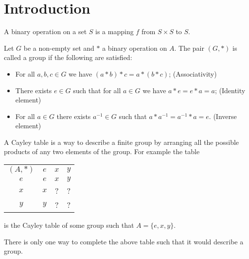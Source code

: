 \documentclass[11pt,a4paper]{article}
\begin{document}
	\maketitle


	\newpage
  \tableofcontents
  \newpage

  \section{Introduction}
  \begin{definition}
    A binary operation on a set $S$ is a mapping $f$ from $S \times S$
    to $S$.
  \end{definition}

  \begin{definition}[Group]
    Let $G$ be a non-empty set and $*$ a binary operation on $A$.
    The pair $(G,*)$ is called a group if the following are satisfied:
	  \begin{itemize}
      \item For all $a,b,c \in G$ we have $(a * b) * c = a * (b * c)$;
        (Associativity)
      \item There exists $e \in G$ such that for all $a \in G$ we have
        $a * e = e * a = a$; (Identity element)
      \item For all $a \in G$ there exists $a^{-1} \in G$ such that
        $a * a^{-1} = a^{-1} * a = e$. (Inverse element)
	  \end{itemize}
  \end{definition}

  \begin{definition}
    A Cayley table is a way to describe a finite group by arranging all
    the possible products of any two elements of the group. For example
    the table
    \begin{center}
    \begin{tabular}{c | c c c}
      $(A,*)$ & $e$ & $x$ & $y$ \\
      \cline{1-4}
      $e$ & $e$ & $x$ & $y$ \\
      $x$ & $x$ & ? & ? \\
      $y$ & $y$ & ? & ? 
    \end{tabular}
    \end{center}
    is the Cayley table of some group such that $A = \{e,x,y\}$.
  \end{definition}
  \begin{remark}
    There is only one way to complete the above table such that it would
    describe a group.
  \end{remark}
\end{document}
